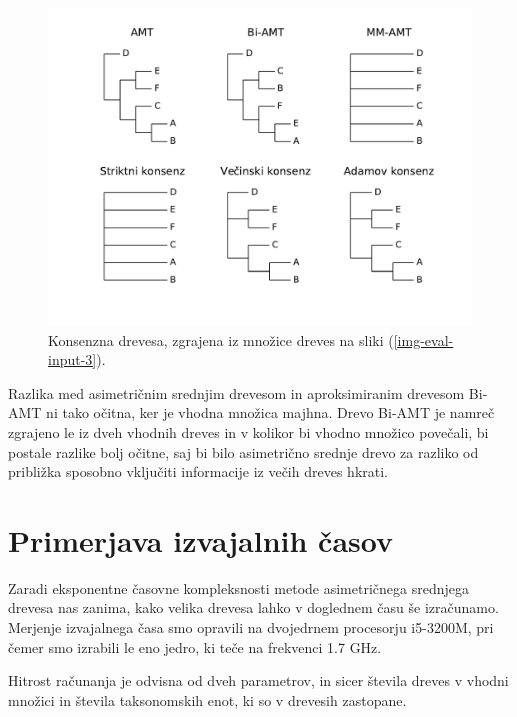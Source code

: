 \documentclass[a4paper, 12pt]{book}
\begin{document}
\begin{figure}
	\begin{center}
		\includegraphics[scale=0.6, clip=true, trim=1.5cm 1.5cm 1cm 0.8cm]{gfx/eval_gfx_3.pdf}
	\end{center}
	\caption{Konsenzna drevesa, zgrajena iz množice dreves na sliki (\ref{img-eval-input-3}).}
	\label{img-eval-result-3}
\end{figure}

Razlika med asimetričnim srednjim drevesom in aproksimiranim drevesom Bi-AMT ni tako očitna, ker je vhodna množica majhna. Drevo Bi-AMT je namreč zgrajeno le iz dveh vhodnih dreves in v kolikor bi vhodno množico povečali, bi postale razlike bolj očitne, saj bi bilo asimetrično srednje drevo za razliko od približka sposobno vključiti informacije iz večih dreves hkrati.

\section{Primerjava izvajalnih časov}
Zaradi eksponentne časovne kompleksnosti metode asimetričnega srednjega drevesa nas zanima, kako velika drevesa lahko v doglednem času še izračunamo. Merjenje izvajalnega časa smo opravili na dvojedrnem procesorju i5-3200M, pri čemer smo izrabili le eno jedro, ki teče na frekvenci 1.7 GHz.

Hitrost računanja je odvisna od dveh parametrov, in sicer števila dreves v vhodni množici in števila taksonomskih enot, ki so v drevesih zastopane.
\end{document}

